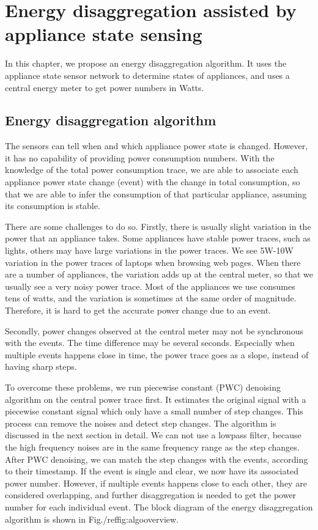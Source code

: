 \chapter{Energy disaggregation assisted by appliance state sensing}\label{chap5}

In this chapter, we propose an energy disaggregation algorithm. It uses the appliance state sensor network to determine states of appliances, and uses a central energy meter to get power numbers in Watts. 

\section{Energy disaggregation algorithm}

The sensors can tell when and which appliance power state is changed. However, it has no capability of providing power consumption numbers. With the knowledge of the total power consumption trace, we are able to associate each appliance power state change (event) with the change in total consumption, so that we are able to infer the consumption of that particular appliance, assuming its consumption is stable. 

There are some challenges to do so. Firstly, there is usually slight variation in the power that an appliance takes. Some appliances have stable power traces, such as lights, others may have large variations in the power traces. We see 5W-10W variation in the power traces of laptops when browsing web pages. When there are a number of appliances, the variation adds up at the central meter, so that we usually see a very noisy power trace. Most of the appliances we use consumes tens of watts, and the variation is sometimes at the same order of magnitude. Therefore, it is hard to get the accurate power change due to an event.

Secondly, power changes observed at the central meter may not be synchronous with the events. The time difference may be several seconds. Especially when multiple events happens close in time, the power trace goes as a slope, instead of having sharp steps. 

To overcome these problems, we run piecewise constant (PWC) denoising algorithm on the central power trace first. It estimates the original signal with a piecewise constant signal which only have a small number of step changes. This process can remove the noises and detect step changes. The algorithm is discussed in the next section in detail. We can not use a lowpass filter, because the high frequency noises are in the same frequency range as the step changes. After PWC denoising, we can match the step changes with the events, according to their timestamp. If the event is single and clear, we now have its associated power number. However, if multiple events happens close to each other, they are considered overlapping, and further disaggregation is needed to get the power number for each individual event. The block diagram of the energy disaggregation algorithm is shown in Fig./ref{fig:algooverview}. 

